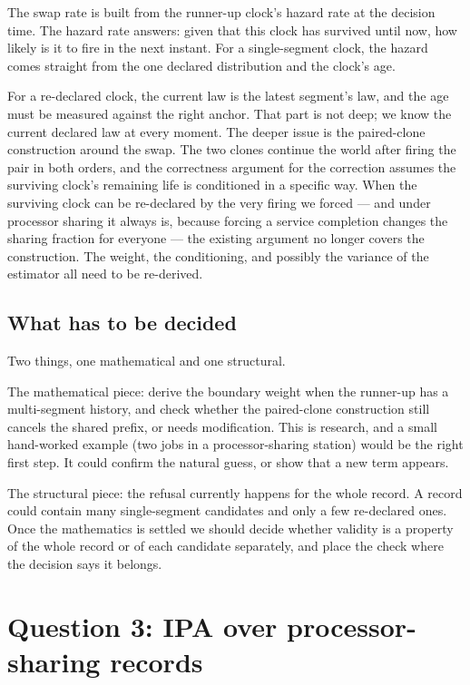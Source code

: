 \documentclass[11pt]{article}
\begin{document}
The swap rate is built from the runner-up clock's hazard rate at the
decision time. The hazard rate answers: given that this clock has survived
until now, how likely is it to fire in the next instant. For a
single-segment clock, the hazard comes straight from the one declared
distribution and the clock's age.

For a re-declared clock, the current law is the latest segment's law, and
the age must be measured against the right anchor. That part is not deep;
we know the current declared law at every moment. The deeper issue is the
paired-clone construction around the swap. The two clones continue the
world after firing the pair in both orders, and the correctness argument
for the correction assumes the surviving clock's remaining life is
conditioned in a specific way. When the surviving clock can be re-declared
by the very firing we forced --- and under processor sharing it always is,
because forcing a service completion changes the sharing fraction for
everyone --- the existing argument no longer covers the construction. The
weight, the conditioning, and possibly the variance of the estimator all
need to be re-derived.

\subsection{What has to be decided}

Two things, one mathematical and one structural.

The mathematical piece: derive the boundary weight when the runner-up has
a multi-segment history, and check whether the paired-clone construction
still cancels the shared prefix, or needs modification. This is research,
and a small hand-worked example (two jobs in a processor-sharing station)
would be the right first step. It could confirm the natural guess, or
show that a new term appears.

The structural piece: the refusal currently happens for the whole record.
A record could contain many single-segment candidates and only a few
re-declared ones. Once the mathematics is settled we should decide whether
validity is a property of the whole record or of each candidate
separately, and place the check where the decision says it belongs.

\section{Question 3: IPA over processor-sharing records}
\end{document}
